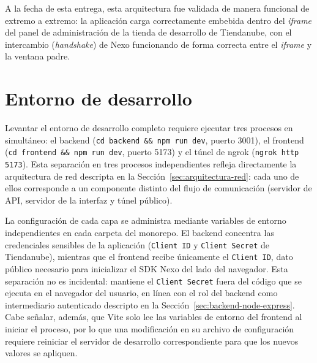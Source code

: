 A la fecha de esta entrega, esta arquitectura fue validada de manera funcional de extremo a extremo: la aplicación carga correctamente embebida dentro del \emph{iframe} del panel de administración de la tienda de desarrollo de Tiendanube, con el intercambio (\emph{handshake}) de Nexo funcionando de forma correcta entre el \emph{iframe} y la ventana padre.

\section{Entorno de desarrollo}

Levantar el entorno de desarrollo completo requiere ejecutar tres procesos en simultáneo: el backend (\texttt{cd backend \&\& npm run dev}, puerto 3001), el frontend (\texttt{cd frontend \&\& npm run dev}, puerto 5173) y el túnel de ngrok (\texttt{ngrok http 5173}). Esta separación en tres procesos independientes refleja directamente la arquitectura de red descripta en la Sección~\ref{sec:arquitectura-red}: cada uno de ellos corresponde a un componente distinto del flujo de comunicación (servidor de API, servidor de la interfaz y túnel público).

La configuración de cada capa se administra mediante variables de entorno independientes en cada carpeta del monorepo. El backend concentra las credenciales sensibles de la aplicación (\texttt{Client ID} y \texttt{Client Secret} de Tiendanube), mientras que el frontend recibe únicamente el \texttt{Client ID}, dato público necesario para inicializar el SDK Nexo del lado del navegador. Esta separación no es incidental: mantiene el \texttt{Client Secret} fuera del código que se ejecuta en el navegador del usuario, en línea con el rol del backend como intermediario autenticado descripto en la Sección~\ref{sec:backend-node-express}. Cabe señalar, además, que Vite solo lee las variables de entorno del frontend al iniciar el proceso, por lo que una modificación en su archivo de configuración requiere reiniciar el servidor de desarrollo correspondiente para que los nuevos valores se apliquen.
